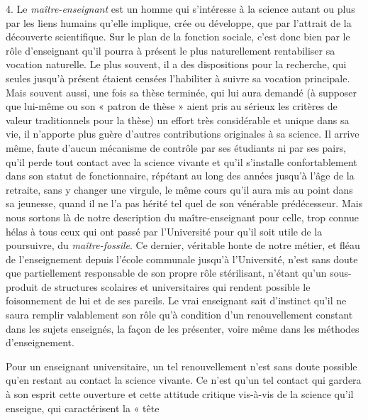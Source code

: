 \documentclass[11pt,a4paper]{article}
\begin{document}
4. Le \emph{maître-enseignant} est un homme qui s'intéresse à la science autant ou
plus par les liens humains qu'elle implique, crée ou développe, que par
l'attrait de la découverte scientifique. Sur le plan de la fonction sociale,
c'est donc bien par le rôle d'enseignant qu'il pourra à présent le plus
naturellement rentabiliser sa vocation naturelle. Le plus souvent, il a des
dispositions pour la recherche, qui seules jusqu'à présent étaient censées
l'habiliter à suivre sa vocation principale. Mais souvent aussi, une fois sa
thèse terminée, qui lui aura demandé (à supposer que lui-même ou son
« patron de thèse » aient pris au sérieux les critères de valeur traditionnels
pour la thèse) un effort très considérable et unique dans sa vie, il
n'apporte plus guère d'autres contributions originales à sa science. Il arrive
même, faute d'aucun mécanisme de contrôle par ses étudiants ni par ses pairs,
qu'il perde tout contact avec la science vivante et qu'il s'installe
confortablement dans son statut de fonctionnaire, répétant au long des années
jusqu'à l'âge de la retraite, sans y changer une virgule, le même cours qu'il
aura mis au point dans sa jeunesse, quand il ne l'a pas hérité tel quel
de son vénérable prédécesseur. Mais nous sortons là de notre description du
maître-enseignant pour celle, trop connue hélas à tous ceux qui ont passé
par l'Université pour qu'il soit utile de la poursuivre, du \emph{maître-fossile}.
Ce dernier, véritable honte de notre métier, et fléau de l'enseignement
depuis l'école communale jusqu'à l'Université, n'est sans doute que
partiellement responsable de son propre rôle stérilisant, n'étant qu'un
sous-produit de structures scolaires et universitaires qui rendent possible le
foisonnement de lui et de ses pareils. Le vrai enseignant sait d'instinct
qu'il ne saura remplir valablement son rôle qu'à condition d'un renouvellement
constant dans les sujets enseignés, la façon de les présenter, voire même
dans les méthodes d'enseignement.

Pour un enseignant universitaire, un tel renouvellement n'est sans
doute possible qu'en restant au contact   la science vivante. Ce n'est
qu'un tel contact qui gardera à son esprit cette ouverture et cette attitude
critique vis-à-vis de la science qu'il enseigne, qui caractérisent la « tête
\end{document}
